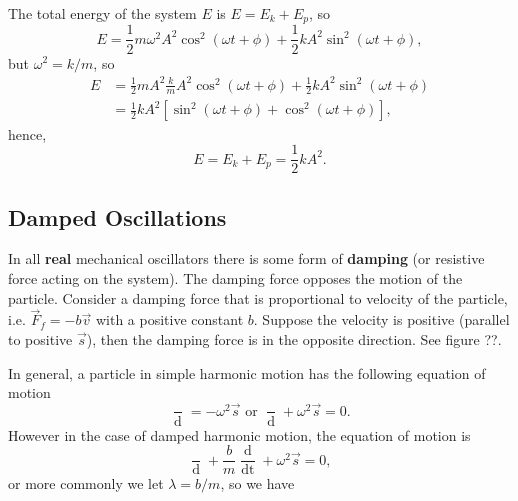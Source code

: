 \noindent The total energy of the system $E$ is $E = E_k + E_p$, so
\begin{equation}
    E = \frac{1}{2} m \omega^2 A^2 \cos^2 (\omega t + \phi) + \frac{1}{2} k A^2 \sin^2 (\omega t + \phi),
\end{equation}
but $\omega^2 = k / m$, so
\begin{align*}
    E &= \frac{1}{2} m A^2 \frac{k}{m} A^2 \cos^2 (\omega t + \phi) + \frac{1}{2} k A^2 \sin^2 (\omega t + \phi) \\
    &= \frac{1}{2} k A^2 \left[\sin^2(\omega t + \phi) + \cos^2(\omega t + \phi)\right],
\end{align*}
hence, 
\begin{equation}
    E = E_k + E_p = \frac{1}{2}kA^2. 
\end{equation}

\subsection{Damped Oscillations}

In all \textbf{real} mechanical oscillators there is some form of \textbf{damping} (or resistive force acting on the system). The damping force opposes the motion of the particle. Consider a damping force that is proportional to velocity of the particle, i.e. $\vec{F}_f = -b \vec{v}$ with a positive constant $b$. Suppose the velocity is positive (parallel to positive $\vec{s}$), then the damping force is in the opposite direction. See figure ??.

In general, a particle in simple harmonic motion has the following equation of motion
\begin{equation}
    \frac{\mathop{\mathrm{d}^2\vec{s}}}{\mathop{\mathrm{d}t^2}} = - \omega^2 \vec{s} \text{ or }
    \frac{\mathop{\mathrm{d}^2\vec{s}}}{\mathop{\mathrm{d}t^2}} + \omega^2 \vec{s} = 0.
\end{equation}
However in the case of damped harmonic motion, the equation of motion is
\begin{equation}
    \frac{\mathop{\mathrm{d}^2\vec{s}}}{\mathop{\mathrm{d}t^2}} + \frac{b}{m} \frac{\mathop{\mathrm{d}\vec{s}}}{\mathop{\mathrm{d}t} }+ \omega^2 \vec{s} = 0,
\end{equation}
or more commonly we let $\lambda = b/m$, so we have

